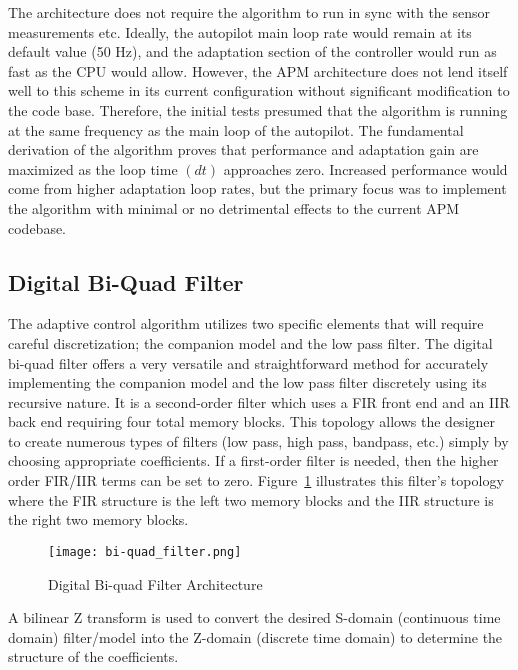 The \Lone architecture does not require the algorithm to run in sync with the sensor measurements etc.  Ideally, the autopilot main loop rate would remain at its default value (50 Hz), and the adaptation section of the \Lone controller would run as fast as the CPU would allow.  However, the \ac{APM} architecture does not lend itself well to this scheme in its current configuration without significant modification to the code base.  Therefore, the initial tests presumed that the \Lone algorithm is running at the same frequency as the main loop of the autopilot.  The fundamental derivation of the \Lone algorithm proves that performance and adaptation gain are maximized as the loop time $(dt)$ approaches zero.  Increased performance would come from higher adaptation loop rates, but the primary focus was to implement the \Lone algorithm with minimal or no detrimental effects to the current \ac{APM} codebase.

\subsection{Digital Bi-Quad Filter}

The \Lone adaptive control algorithm utilizes two specific elements that will require careful discretization; the companion model and the low pass filter.  The digital bi-quad filter offers a very versatile and straightforward method for accurately implementing the companion model and the low pass filter discretely using its recursive nature.  It is a second-order filter which uses a \ac{FIR} front end and an \ac{IIR} back end requiring four total memory blocks.  This topology allows the designer to create numerous types of filters (low pass, high pass, bandpass, etc.) simply by choosing appropriate coefficients.  If a first-order filter is needed, then the higher order FIR/IIR terms can be set to zero.  Figure~\ref{fig:bi-quad} illustrates this filter's topology where the \ac{FIR} structure is the left two memory blocks and the \ac{IIR} structure is the right two memory blocks.

\begin{figure}[h!]
 \centering
  \texttt{[image: bi-quad\_filter.png]}
  \caption{Digital Bi-quad Filter Architecture }
  \label{fig:bi-quad}
\end{figure}

A bilinear Z transform is used to convert the desired S-domain (continuous time domain) filter/model into the Z-domain (discrete time domain) to determine the structure of the coefficients.

